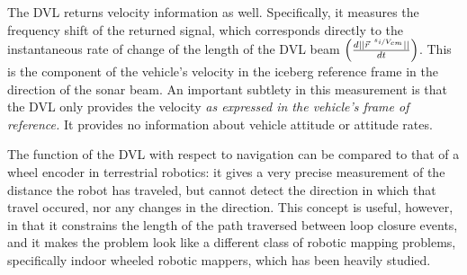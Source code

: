 The DVL returns velocity information as well. Specifically, it measures the frequency shift of the returned signal, which corresponds directly to the instantaneous rate of change of the length of the DVL beam $\left( \frac{d||\vec{r}^{~\nicefrac{s_i}{V_{cm}}}||}{dt}\right)$. This is the component of the vehicle's velocity in the iceberg reference frame in the direction of the sonar beam. An important subtlety in this measurement is that the DVL only provides the velocity \emph{as expressed in the vehicle's frame of reference.} It provides no information about vehicle attitude or attitude rates. 

The function of the DVL with respect to navigation can be compared to that of a wheel encoder in terrestrial robotics: it gives a very precise measurement of the distance the robot has traveled, but cannot detect the direction in which that travel occured, nor any changes in the direction. This concept is useful, however, in that it constrains the length of the path traversed between loop closure events, and it makes the problem look like a different class of robotic mapping problems, specifically indoor wheeled robotic mappers, which has been heavily studied. 

